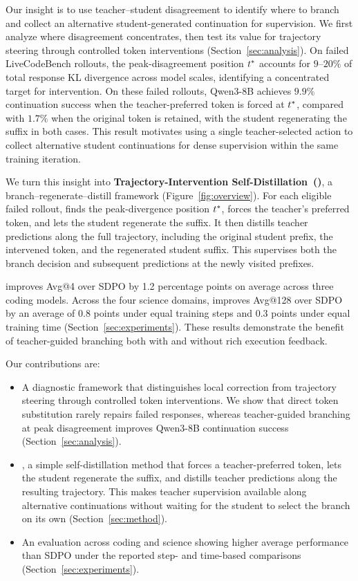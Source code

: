 Our insight is to use teacher--student disagreement to identify where to branch and collect an alternative student-generated continuation for supervision. We first analyze where disagreement concentrates, then test its value for trajectory steering through controlled token interventions (Section~\ref{sec:analysis}). On failed LiveCodeBench rollouts, the peak-disagreement position $t^{*}$ accounts for $9$--$20\%$ of total response KL divergence across model scales, identifying a concentrated target for intervention. 
On these failed rollouts, Qwen3-8B achieves $9.9\%$ continuation success when the teacher-preferred token is forced at $t^{*}$, compared with $1.7\%$ when the original token is retained, with the student regenerating the suffix in both cases.
This result motivates using a single teacher-selected action to collect alternative student continuations for dense supervision within the same training iteration.

We turn this insight into \textbf{Trajectory-Intervention Self-Distillation~(\method{})}, a branch--regenerate--distill framework (Figure~\ref{fig:overview}). For each eligible failed rollout, \method{} finds the peak-divergence position $t^{*}$, forces the teacher's preferred token, and lets the student regenerate the suffix. It then distills teacher predictions along the full trajectory, including the original student prefix, the intervened token, and the regenerated student suffix. This supervises both the branch decision and subsequent predictions at the newly visited prefixes.

{\method{} improves Avg@4 over SDPO by 1.2 percentage points on average across three coding models. Across the four science domains, \method{} improves Avg@128 over SDPO by an average of 0.8 points under equal training steps and 0.3 points under equal training time (Section~\ref{sec:experiments}). These results demonstrate the benefit of teacher-guided branching both with and without rich execution feedback.}



Our contributions are:
\begin{itemize}[itemsep=0pt, topsep=0pt, parsep=0pt, partopsep=0pt, leftmargin=*]
\item A diagnostic framework that distinguishes local correction from trajectory steering through controlled token interventions. We show that direct token substitution rarely repairs failed responses, whereas teacher-guided branching at peak disagreement improves Qwen3-8B continuation success (Section~\ref{sec:analysis}).
\item \textbf{\method{}}, a simple self-distillation method that forces a teacher-preferred token, lets the student regenerate the suffix, and distills teacher predictions along the resulting trajectory. This makes teacher supervision available along alternative continuations without waiting for the student to select the branch on its own (Section~\ref{sec:method}).
\item {An evaluation across coding and science showing higher average performance than SDPO under the reported step- and time-based comparisons (Section~\ref{sec:experiments}).}

\end{itemize}


